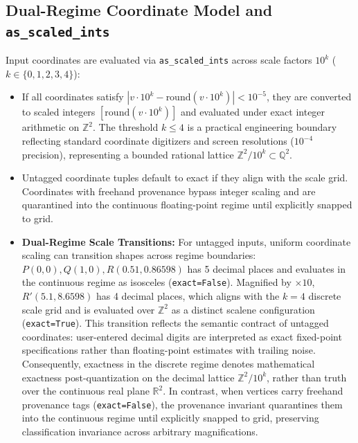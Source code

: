 \documentclass[preprint,12pt]{elsarticle}
\begin{document}
\subsection{Dual-Regime Coordinate Model and \texttt{as\_scaled\_ints}}
\label{sec:dual_regime}
Input coordinates are evaluated via \texttt{as\_scaled\_ints} across scale factors $10^k$ ($k \in \{0, 1, 2, 3, 4\}$):
\begin{itemize}
\item If all coordinates satisfy $|v \cdot 10^k - \text{round}(v \cdot 10^k)| < 10^{-5}$, they are converted to scaled integers $[\text{round}(v \cdot 10^k)]$ and evaluated under exact integer arithmetic on $\mathbb{Z}^2$. The threshold $k \le 4$ is a practical engineering boundary reflecting standard coordinate digitizers and screen resolutions ($10^{-4}$ precision), representing a bounded rational lattice $\mathbb{Z}^2 / 10^k \subset \mathbb{Q}^2$.
\item Untagged coordinate tuples default to exact if they align with the scale grid. Coordinates with freehand provenance bypass integer scaling and are quarantined into the continuous floating-point regime until explicitly snapped to grid.
\item \textbf{Dual-Regime Scale Transitions:} For untagged inputs, uniform coordinate scaling can transition shapes across regime boundaries: $P(0,0), Q(1,0), R(0.51, 0.86598)$ has 5 decimal places and evaluates in the continuous regime as isosceles (\texttt{exact=False}). Magnified by $\times 10$, $R'(5.1, 8.6598)$ has 4 decimal places, which aligns with the $k=4$ discrete scale grid and is evaluated over $\mathbb{Z}^2$ as a distinct scalene configuration (\texttt{exact=True}). This transition reflects the semantic contract of untagged coordinates: user-entered decimal digits are interpreted as exact fixed-point specifications rather than floating-point estimates with trailing noise. Consequently, exactness in the discrete regime denotes mathematical exactness post-quantization on the decimal lattice $\mathbb{Z}^2 / 10^k$, rather than truth over the continuous real plane $\mathbb{R}^2$. In contrast, when vertices carry freehand provenance tags (\texttt{exact=False}), the provenance invariant quarantines them into the continuous regime until explicitly snapped to grid, preserving classification invariance across arbitrary magnifications.
\end{itemize}
\end{document}

